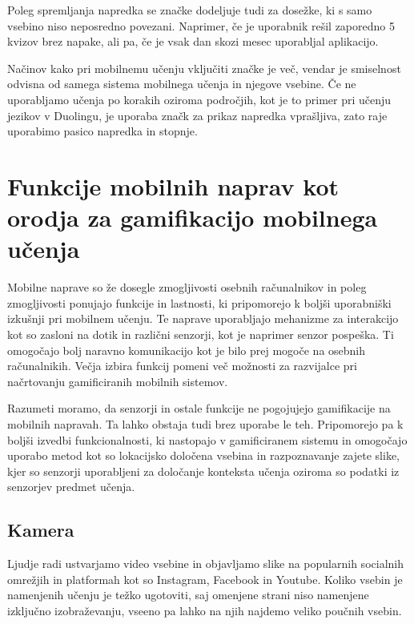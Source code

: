 \documentclass[a4paper, 12pt]{book}
\begin{document}
\noindent Poleg spremljanja napredka se značke dodeljuje tudi za dosežke, ki s samo vsebino niso neposredno povezani. Naprimer, če je uporabnik rešil zaporedno 5 kvizov brez napake, ali pa, če je vsak dan skozi mesec uporabljal aplikacijo.

Načinov kako pri mobilnemu učenju vključiti značke je več, vendar je smiselnost odvisna od samega sistema mobilnega učenja in njegove vsebine. Če ne uporabljamo učenja po korakih oziroma področjih, kot je to primer pri učenju jezikov v Duolingu, je uporaba značk za prikaz napredka vprašljiva, zato raje uporabimo pasico napredka in stopnje.

\chapter{Funkcije mobilnih naprav kot orodja za gamifikacijo mobilnega učenja}
\label{ch4}

Mobilne naprave so že dosegle zmogljivosti osebnih računalnikov in poleg zmogljivosti ponujajo funkcije in lastnosti, ki pripomorejo k boljši uporabniški izkušnji pri mobilnem učenju. Te naprave uporabljajo mehanizme za interakcijo kot so zasloni na dotik in različni senzorji, kot je naprimer senzor pospeška. Ti omogočajo bolj naravno komunikacijo kot je bilo prej mogoče na osebnih računalnikih. Večja izbira funkcij pomeni več možnosti za razvijalce pri načrtovanju gamificiranih mobilnih sistemov.

Razumeti moramo, da senzorji in ostale funkcije ne pogojujejo gamifikacije na mobilnih napravah. Ta lahko obstaja tudi brez uporabe le teh. Pripomorejo pa k boljši izvedbi funkcionalnosti, ki nastopajo v gamificiranem sistemu in omogočajo uporabo metod kot so lokacijsko določena vsebina in razpoznavanje zajete slike, kjer so senzorji uporabljeni za določanje konteksta učenja oziroma so podatki iz senzorjev predmet učenja.

 
\section{Kamera}
Ljudje radi ustvarjamo video vsebine in objavljamo slike na popularnih socialnih omrežjih in platformah kot so Instagram, Facebook in Youtube. Koliko vsebin je namenjenih učenju je težko ugotoviti, saj omenjene strani niso namenjene izključno izobraževanju, vseeno pa lahko na njih najdemo veliko poučnih vsebin.
\end{document}
